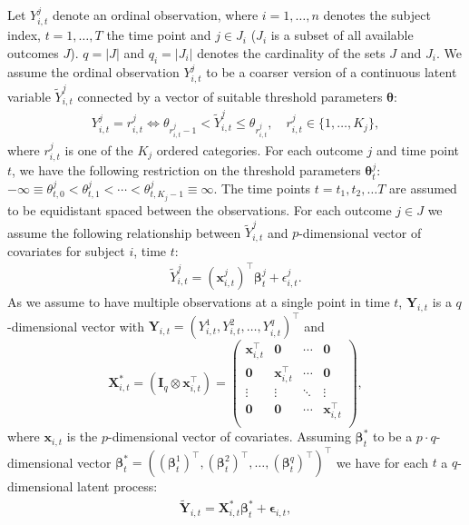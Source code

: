 \documentclass{article}
\begin{document}
Let $Y_{i,t}^j$ denote an ordinal observation, where $i = 1, \ldots, n$ denotes the subject index, $t = 1, \ldots, T$ the time point and $j \in J_i$ ($J_i$ is a subset of all available outcomes $J$). $q = |J|$ and $q_i = |J_i|$ denotes the cardinality of the sets $J$ and $J_i$.
We assume the ordinal observation $Y_{i,t}^j$ to be a coarser version of a continuous latent variable $\tilde Y_{i,t}^j$ connected by a vector of suitable threshold parameters $\bm \theta$:
\begin{align*}
Y_{i,t}^j = r_{i,t}^j \Leftrightarrow \theta_{r_{i,t}^j-1} < \tilde Y_{i,t}^j \leq \theta_{r_{i,t}^j}, \quad r_{i,t}^j \in \{1, \ldots, K_j\},
\end{align*}
where $r_{i,t}^j$ is one of the $K_j$ ordered categories. For each outcome $j$ and time point $t$, we have the following restriction on the threshold parameters $\bm \theta_t^j$: $-\infty \equiv \theta_{t,0}^j < \theta_{t,1}^j < \cdots < \theta_{t,K_j-1}^j \equiv \infty$. The time points $t = t_1, t_2, \ldots T$ are assumed to be equidistant spaced between the observations. For each outcome $j \in J$ we assume the following relationship between $\tilde Y_{i,t}^j$ and $p$-dimensional vector of covariates for subject $i$, time $t$:
\begin{align*}
  \tilde{Y}_{i,t}^j = (\bm{x}_{i,t}^j)^\top {\bm \beta}_{t}^j + \epsilon_{i,t}^j.
\end{align*}
As we assume to have multiple observations at a single point in time $t$, $\bm Y_{i,t}$ is a $q$-dimensional vector with $\bm Y_{i,t} = (Y_{i,t}^1, Y_{i,t}^2, \ldots, Y_{i,t}^{q})^\top$ and
$$\bm{X}_{i,t}^* = (\bm I_q \otimes \bm x_{i,t}^\top) = \begin{pmatrix}\bm x_{i,t}^\top & \bm 0 & \cdots & \bm 0\\
\bm 0 & \bm x_{i,t}^\top & \cdots & \bm 0\\
\vdots & \vdots & \ddots & \vdots\\
\bm 0 & \bm 0 & \cdots & \bm x_{i,t}^\top\\
\end{pmatrix},
$$
where $\bm x_{i,t}$ is the $p$-dimensional vector of covariates. Assuming $\bm \beta_t^*$ to be a $p\cdot q$-dimensional vector $\bm \beta_t^* =((\bm{\beta}_{t}^1)^\top, (\bm{\beta}_{t}^2)^\top, \ldots, (\bm{\beta}_{t}^q)^\top)^\top$ we have for each $t$ a $q$-dimensional latent process:
\begin{align*}
{\bm {\tilde Y}}_{i,t} =  \bm{X}_{i,t}^* \bm \beta_t^* + \bm \epsilon_{i,t},
\end{align*}
\end{document}
